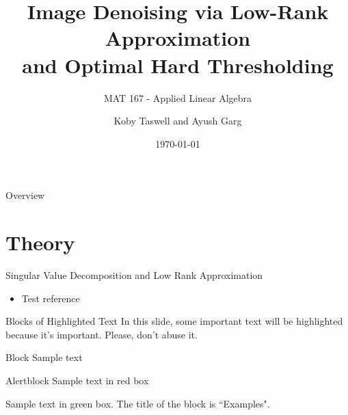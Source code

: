 \documentclass[aspectratio=169,xcolor=dvipsnames]{beamer}
\title[Denoising with SVD]{Image Denoising via Low-Rank Approximation\\ and Optimal Hard Thresholding}
\subtitle{MAT 167 - Applied Linear Algebra}
\author[Taswell and Garg] {Koby Taswell and Ayush Garg}
\institute[UCD] %
{
	University of California, Davis 
	\vskip 3pt
}
\date{\today} %
\begin{document}
	
	\begin{frame}
		\titlepage
	\end{frame}
	
	\begin{frame}{Overview}
		\tableofcontents
	\end{frame}
	
	\section{Theory}
	
	\begin{frame}{Singular Value Decomposition and Low Rank Approximation}
		\begin{itemize}
			\item Test reference \cite{Golub1987}
		\end{itemize}
	\end{frame}
	
	
	\begin{frame}{Blocks of Highlighted Text}
		In this slide, some important text will be \alert{highlighted} because it's important. Please, don't abuse it.
		
		\begin{block}{Block}
			Sample text
		\end{block}
		
		\begin{alertblock}{Alertblock}
			Sample text in red box
		\end{alertblock}
		
		\begin{examples}
			Sample text in green box. The title of the block is ``Examples".
		\end{examples}
	\end{frame}
	
	
\end{document}
